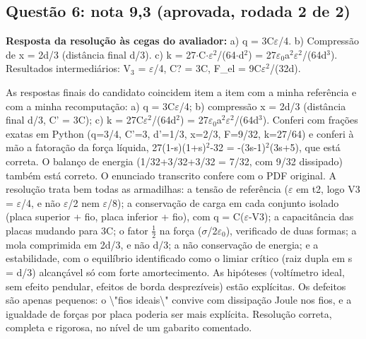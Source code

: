 \documentclass{article}%
\begin{document}
\subsection*{Questão 6: nota 9,3 (aprovada, rodada 2 de 2)}%
\textbf{Resposta da resolução às cegas do avaliador:} a) q = 3C$\varepsilon$/4.\newline%
b) Compressão de x = 2d/3 (distância final d/3).\newline%
c) k = 27$\cdot$C$\cdot$$\varepsilon$$^2$/(64$\cdot$d$^2$) = 27$\varepsilon$$_{0}$a$^2$$\varepsilon$$^2$/(64d$^3$).\newline%
\newline%
Resultados intermediários: V$_{3}$ = $\varepsilon$/4, C? = 3C, F\_el = 9C$\varepsilon$$^2$/(32d).\par %
As respostas finais do candidato coincidem item a item com a minha referência e com a minha recomputação: a) q = 3C$\varepsilon$/4; b) compressão x = 2d/3 (distância final d/3, C' = 3C); c) k = 27C$\varepsilon$$^2$/(64d$^2$) = 27$\varepsilon$$_{0}$a$^2$$\varepsilon$$^2$/(64d$^3$). Conferi com frações exatas em Python (q=3/4, C'=3, d'=1/3, x=2/3, F=9/32, k=27/64) e conferi à mão a fatoração da força líquida, 27(1-s)(1+s)$^2$-32 = -(3s-1)$^2$(3s+5), que está correta. O balanço de energia (1/32+3/32+3/32 = 7/32, com 9/32 dissipado) também está correto. O enunciado transcrito confere com o PDF original. A resolução trata bem todas as armadilhas: a tensão de referência ($\varepsilon$ em t2, logo V3 = $\varepsilon$/4, e não $\varepsilon$/2 nem $\varepsilon$/8); a conservação de carga em cada conjunto isolado (placa superior + fio, placa inferior + fio), com q = C($\varepsilon$-V3); a capacitância das placas mudando para 3C; o fator $\frac12$ na força ($\sigma$/2$\varepsilon$$_{0}$), verificado de duas formas; a mola comprimida em 2d/3, e não d/3; a não conservação de energia; e a estabilidade, com o equilíbrio identificado como o limiar crítico (raiz dupla em s = d/3) alcançável só com forte amortecimento. As hipóteses (voltímetro ideal, sem efeito pendular, efeitos de borda desprezíveis) estão explícitas. Os defeitos são apenas pequenos: o \textbackslash{}"fios ideais\textbackslash{}" convive com dissipação Joule nos fios, e a igualdade de forças por placa poderia ser mais explícita. Resolução correta, completa e rigorosa, no nível de um gabarito comentado.%
$$
\end{document}
